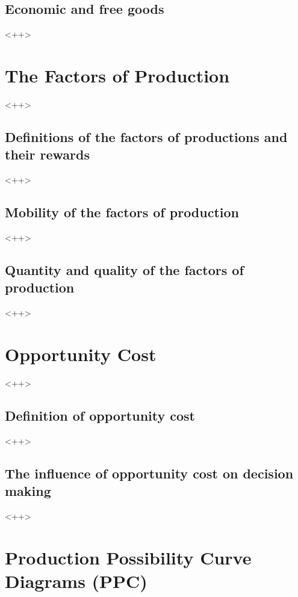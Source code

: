 \documentclass[11pt, a4paper, openany]{book}
\begin{document}
\subsection{Economic and free goods}

<++>

\section{The Factors of Production}

<++>

\subsection{Definitions of the factors of productions and their rewards}

<++>

\subsection{Mobility of the factors of production}

<++>

\subsection{Quantity and quality of the factors of production}

<++>

\section{Opportunity Cost}

<++>

\subsection{Definition of opportunity cost}

<++>

\subsection{The influence of opportunity cost on decision making}

<++>

\section{Production Possibility Curve Diagrams (PPC)}
\end{document}
